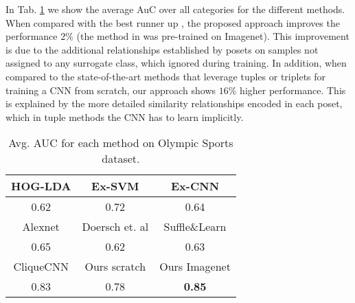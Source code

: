 \documentclass[10pt,twocolumn,letterpaper]{article}
\begin{document}
In Tab. \ref{tab:avg_auc} we show the average AuC over all categories for the different methods. When compared with the best runner up \cite{cliquecnn}, the proposed approach improves the performance $2\%$ (the method in \cite{cliquecnn} was pre-trained on Imagenet). This improvement is due to the additional relationships established by posets on samples not assigned to any surrogate class, which \cite{cliquecnn} ignored during training. In addition, when compared to the state-of-the-art methods that leverage tuples \cite{ConvNetpretext1} or triplets \cite{shuffleandlearn} for training a CNN from scratch, our approach shows $16\%$ higher performance. This is explained by the more detailed similarity relationships encoded in each poset, which in tuple methods the CNN has to learn implicitly.




\begin{table}
    \scriptsize
    \centering
    \begin{tabular}{|c|c|c|}
    \hline
    HOG-LDA \cite{hoglda} & Ex-SVM \cite{exemplarsvm} & Ex-CNN \cite{exemplarcnn}\\ \hline 
    0.62 &  0.72  &   0.64   \\ \hline \hline
    Alexnet \cite{alexnet} & Doersch et. al \cite{ConvNetpretext1} & Suffle\&Learn \cite{shuffleandlearn}   \\ \hline
    0.65 & 0.62 & 0.63 \\ \hline \hline
    CliqueCNN \cite{cliquecnn} & Ours scratch &  Ours Imagenet\\ \hline
      0.83 & 0.78 & \textbf{0.85} \\ \hline
    \end{tabular}
    \caption{Avg. AUC for each method on Olympic Sports dataset.}
    \label{tab:avg_auc}
\end{table}
\end{document}
